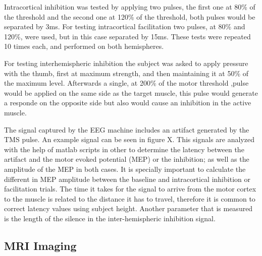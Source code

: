 Intracortical inhibition was tested by applying two pulses, the first one at 80\% of the threshold and the second one at 120\% of the threshold, both pulses would be separated by 3ms. For testing intracortical facilitation two pulses, at 80\% and 120\%, were used, but in this case separated by 15ms. These tests were repeated 10 times each, and performed on both hemispheres.

For testing interhemispheric inhibition the subject was asked to apply pressure with the thumb, first at maximum strength, and then maintaining it at 50\% of the maximum level. Afterwards a single, at 200\% of the motor threshold ,pulse would be applied on the same side as the target muscle, this pulse would generate a responde on the opposite side but also would cause an inhibition in the active muscle. 

The signal captured by the EEG machine includes an artifact generated by the TMS pulse. An example signal can be seen in figure X. This signals are analyzed with the help of matlab scripts in other to determine the latency between the artifact and the motor evoked potential (MEP) or the inhibition; as well as the amplitude of the MEP in both cases. It is specially important to calculate the different in MEP amplitude between the baseline and intracortical inhibition or facilitation trials. The time it takes for the signal to arrive from the motor cortex to the muscle is related to the distance it has to travel, therefore it is common to correct latency values using subject height. Another parameter that is measured is the length of the silence in the inter-hemispheric inhibition signal.


\subsection{MRI Imaging}



